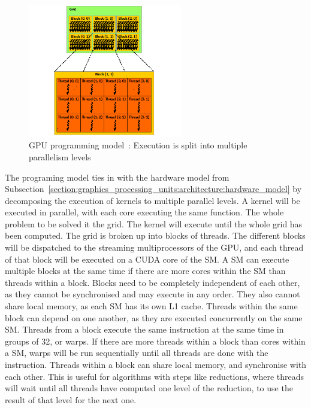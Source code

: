 \begin{figure}[H]
	\centering
	\includegraphics[width=0.6\textwidth]{Chapter_graphics_processing_units/media/grid-of-thread-blocks}
	\caption{GPU programming model~\cite{Nvidia2021}: Execution is split into multiple parallelism levels}
	\label{fig:gpu_programming_model}
\end{figure}

The programing model ties in with the hardware model from
Subsection~\ref{section:graphics_processing_units:architecture:hardware_model} by decomposing the
execution of kernels to multiple parallel levels. A kernel will be executed in parallel, with each
core executing the same function. The whole problem to be solved it the grid. The kernel will
execute until the whole grid has been computed. The grid is broken up into blocks of threads. The
different blocks will be dispatched to the streaming multiprocessors of the GPU, and each thread of
that block will be executed on a CUDA core of the SM. A SM can execute multiple blocks at the same
time if there are more cores within the SM than threads within a block. Blocks need to be completely
independent of each other, as they cannot be synchronised and may execute in any order. They also
cannot share local memory, as each SM has its own L1 cache. Threads within the same block can depend
on one another, as they are executed concurrently on the same SM. Threads from a block execute the
same instruction at the same time in groups of 32, or warps. If there are more threads within a
block than cores within a SM, warps will be run sequentially until all threads are done with the
instruction. Threads within a block can share local memory, and synchronise with each other. This is
useful for algorithms with steps like reductions, where threads will wait until all threads have
computed one level of the reduction, to use the result of that level for the next one.

